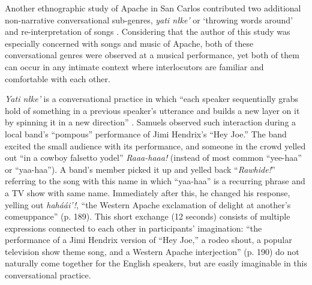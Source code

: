 \documentclass[12pt]{article}
\begin{document}
Another ethnographic study of Apache in San Carlos contributed two additional non-narrative conversational sub-genres, \textit{yati n\l ke'} or `throwing words around' and re-interpretation of songs \parencite{samuels2004}. Considering that the author of this study was especially concerned with songs and music of Apache, both of these conversational genres were observed at a musical performance, yet both of them can occur in any intimate context where interlocutors are familiar and comfortable with each other. 

\textit{Yati n\l ke'} is a conversational practice in which ``each speaker sequentially grabs hold of something in a previous speaker's utterance and builds a new layer on it by spinning it in a new direction'' \textcite[p. 190]{samuels2004}. Samuels observed such interaction during a local band's ``pompous'' performance of Jimi Hendrix's ``Hey Joe.'' The band excited the small audience with its performance, and someone in the crowd yelled out ``in a cowboy falsetto yodel'' \textit{Raaa-haaa!} (instead of most common ``yee-haa'' or ``yaa-haa''). A band's member picked it up and yelled back ``\textit{Rawhide!}'' referring to the song with this name in which ``yaa-haa'' is a recurring phrase and a TV show with same name. Immediately after this, he changed his response, yelling out \textit{hah\'a\'ai'!}, ``the Western Apache exclamation of delight at another's comeuppance'' (p. 189). This short exchange (12 seconds) consists of multiple expressions connected to each other in participants' imagination: ``the performance of a Jimi Hendrix version of ``Hey Joe,'' a rodeo shout, a popular television show theme song, and a Western Apache interjection'' (p. 190) do not naturally come together for the English speakers, but are easily imaginable in this conversational practice. 
\end{document}
